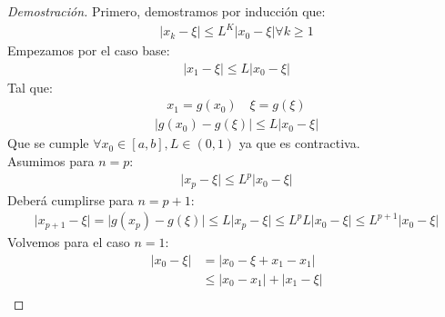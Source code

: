 \documentclass{article}
\begin{document}
\begin{proof}[Demostración]
    Primero, demostramos por inducción que:
    \begin{equation}
        \begin{split}
            |x_{k}-\xi | \leq L^{K} |x_{0}-\xi | \forall k \geq 1
        \end{split}
    \end{equation}
    Empezamos por el caso base:
    \begin{equation}
        \begin{split}
            |x_{1}-\xi | \leq L|x_{0}-\xi |
        \end{split}
    \end{equation}
    Tal que:
    \begin{equation}
        \begin{split}
            x_{1}=g(x_{0}) \quad \xi =g(\xi )
        \end{split}
    \end{equation}
    \begin{equation}
        \begin{split}
            \lvert g(x_{0})-g(\xi ) \rvert \leq L \lvert x_{0}-\xi  \rvert  
        \end{split}
    \end{equation}
    Que se cumple $\forall x_{0} \in [a,b], L \in (0,1)$ ya que es contractiva.\\
    Asumimos para $n=p$:
    \begin{equation}
        \begin{split}
            \lvert x_{p}-\xi  \rvert \leq L^{p}|x_{0}-\xi |
        \end{split}
    \end{equation}
    Deberá cumplirse para $n=p+1$:
    \begin{equation}
        \begin{split}
            \lvert x_{p+1}-\xi  \rvert = \lvert g(x_{p})-g(\xi ) \rvert \leq L\lvert x_{p}-\xi \rvert
            \leq L^{p}L \lvert x_{0}-\xi  \rvert\leq L^{p+1}\lvert x_{0}-\xi  \rvert   
        \end{split}
    \end{equation}
    Volvemos para el caso $n=1$:
    \begin{equation}
        \begin{split}
            \lvert x_{0}-\xi  \rvert &= \lvert x_{0}-\xi +x_{1}-x_{1} \rvert\\
            &\leq \lvert x_{0}-x_{1} \rvert + \lvert x_{1}-\xi  \rvert\\

\end{split}
\end{equation}
\end{proof}
\end{document}
